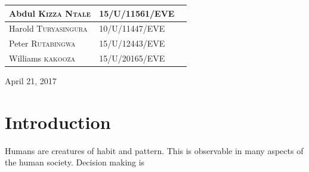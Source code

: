 \documentclass[12pt, a4paper]{report}
\begin{document}
\begin{titlepage}


\begin{table}[!hb]
\centering
\begin{tabular}{|l|l|l|}
\hline
Abdul \textsc{Kizza Ntale} & \textsc{15/U/11561/EVE} \\ \hline
Harold \textsc{Turyasingura} & \textsc{10/U/11447/EVE} \\ \hline
Peter \textsc{Rutabingwa} & \textsc{15/U/12443/EVE} \\ \hline
Williams \textsc{kakooza} & \textsc{15/U/20165/EVE} \\
\hline
\end{tabular}
\end{table}

{\large April 21, 2017}

\vfill

\end{titlepage}

\tableofcontents
\newpage

\sectionfont{\scshape}
\section*{Introduction}
Humans are creatures of habit and pattern. This is observable in many aspects of the human
society. Decision making is 
\end{document}
